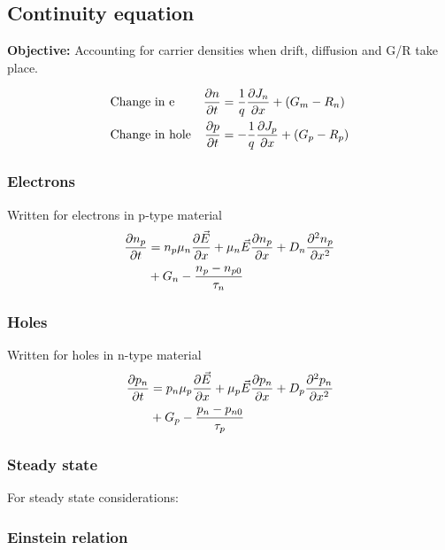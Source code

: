 \documentclass[a4paper, fontsize=8pt, landscape, DIV=1]{scrartcl}
\begin{document}
\begin{multicols*}{4}
  \subsection{Continuity equation}
    \textbf{Objective:} Accounting for carrier densities when drift, diffusion and G/R take place.
    
    \begin{align*}
      &\text{Change in e} & \frac{\partial n}{\partial t} &= \frac{1}{q}\frac{\partial J_n}{\partial x}+(G_m-R_n) \\
      &\text{Change in hole} & \frac{\partial p}{\partial t} &= -\frac{1}{q}\frac{\partial J_p}{\partial x}+(G_p-R_p)
    \end{align*}

    \subsubsection{Electrons}
    Written for electrons in p-type material
    \begin{align*}
      \frac{\partial n_p}{\partial t} &= n_p\mu_n\frac{\partial\vec{E}}{\partial x}+\mu_n\vec{E}\frac{\partial n_p}{\partial x} + D_n\frac{\partial^2n_p}{\partial x^2} \\ &+ G_n - \frac{n_p-n_{p0}}{\tau_n}
    \end{align*}

    \subsubsection{Holes}
    Written for holes in n-type material
    \begin{align*}
      \frac{\partial p_n}{\partial t} &= p_n\mu_p\frac{\partial\vec{E}}{\partial x}+\mu_p\vec{E}\frac{\partial p_n}{\partial x} + D_p\frac{\partial^2p_n}{\partial x^2} \\ &+ G_p - \frac{p_n-p_{n0}}{\tau_p}
    \end{align*}

    \subsubsection{Steady state}
    For steady state considerations:

    
    \subsubsection{Einstein relation}
    \begin{center}
       
    \end{center}


\end{multicols*}
\end{document}
